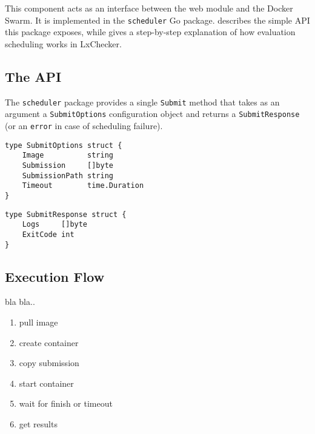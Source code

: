 This component acts as an interface between the web module and the Docker Swarm. It is implemented in the \texttt{scheduler} Go package.  describes the simple API this package exposes, while  gives a step-by-step explanation of how evaluation scheduling works in LxChecker. 

\subsection{The API}
\label{sub-sec:scheduler-api}

The \texttt{scheduler} package provides a single \texttt{Submit} method that takes as an argument a \texttt{SubmitOptions} configuration object and returns a \texttt{SubmitResponse} (or an \texttt{error} in case of scheduling failure).

\begin{lstlisting}
type SubmitOptions struct {
	Image          string
	Submission     []byte
	SubmissionPath string
	Timeout        time.Duration
}
\end{lstlisting}

\begin{lstlisting}
type SubmitResponse struct {
	Logs     []byte
	ExitCode int
}
\end{lstlisting}


\subsection{Execution Flow}
\label{sub-sec:scheduler-execution}


 bla bla..

\begin{enumerate}
	\item pull image
	\item create container
	\item copy submission
	\item start container
	\item wait for finish or timeout
	\item get results
\end{enumerate}

